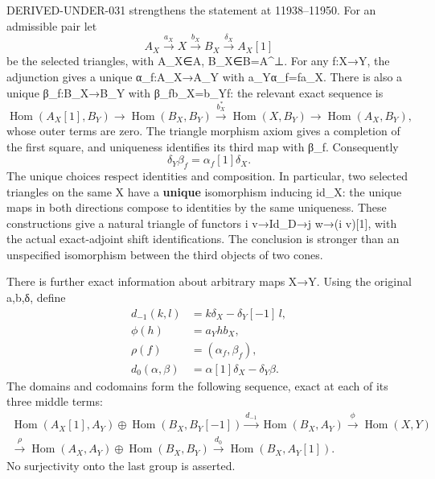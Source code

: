 DERIVED-UNDER-031 strengthens the statement at 11938–\allowbreak{}11950. For an admissible pair let \[
 A_X\xrightarrow{a_X}X\xrightarrow{b_X}B_X
 \xrightarrow{\delta_X}A_X[1]
\] be the selected triangles,\allowbreak{} with A\_\allowbreak{}X\allowbreak{}∈A,\allowbreak{} B\_\allowbreak{}X\allowbreak{}∈B\allowbreak{}=A\textasciicircum{}⊥. For any f:\allowbreak{}X\allowbreak{}→Y,\allowbreak{} the adjunction gives a unique α\_\allowbreak{}f:\allowbreak{}A\_\allowbreak{}X\allowbreak{}→A\_\allowbreak{}Y with a\_\allowbreak{}Yα\_\allowbreak{}f\allowbreak{}=fa\_\allowbreak{}X. There is also a unique β\_\allowbreak{}f:\allowbreak{}B\_\allowbreak{}X\allowbreak{}→B\_\allowbreak{}Y with β\_\allowbreak{}fb\_\allowbreak{}X\allowbreak{}=b\_\allowbreak{}Yf:\allowbreak{} the relevant exact sequence is \[
 \operatorname{Hom}(A_X[1],B_Y)\longrightarrow
 \operatorname{Hom}(B_X,B_Y)\xrightarrow{b_X^*}
 \operatorname{Hom}(X,B_Y)\longrightarrow\operatorname{Hom}(A_X,B_Y),
\] whose outer terms are zero. The triangle morphism axiom gives a completion of the first square,\allowbreak{} and uniqueness identifies its third map with β\_\allowbreak{}f. Consequently \[
 \delta_Y\beta_f=\alpha_f[1]\delta_X.
\] The unique choices respect identities and composition. In particular,\allowbreak{} two selected triangles on the same X have a \textbf{unique} isomorphism inducing id\_\allowbreak{}X:\allowbreak{} the unique maps in both directions compose to identities by the same uniqueness. These constructions give a natural triangle of functors i v\allowbreak{}→Id\_\allowbreak{}D\allowbreak{}→j w\allowbreak{}→(i v)\allowbreak{}[1]\allowbreak{},\allowbreak{} with the actual exact-adjoint shift identifications. The conclusion is stronger than an unspecified isomorphism between the third objects of two cones.

There is further exact information about arbitrary maps X\allowbreak{}→Y. Using the original a,\allowbreak{}b,\allowbreak{}δ,\allowbreak{} define \[
\begin{aligned}
 d_{-1}(k,l)&=k\delta_X-\delta_Y[-1]\,l,\\
 \phi(h)&=a_Yh b_X,\\
 \rho(f)&=(\alpha_f,\beta_f),\\
 d_0(\alpha,\beta)&=\alpha[1]\delta_X-\delta_Y\beta.
\end{aligned}
\] The domains and codomains form the following sequence,\allowbreak{} exact at each of its three middle terms:\allowbreak{} \[
\begin{gathered}
 \operatorname{Hom}(A_X[1],A_Y)\oplus
 \operatorname{Hom}(B_X,B_Y[-1])
 \xrightarrow{d_{-1}}\operatorname{Hom}(B_X,A_Y)
 \xrightarrow{\phi}\operatorname{Hom}(X,Y)\\
 \xrightarrow{\rho}
 \operatorname{Hom}(A_X,A_Y)\oplus\operatorname{Hom}(B_X,B_Y)
 \xrightarrow{d_0}\operatorname{Hom}(B_X,A_Y[1]).
 \tag{5.1}
\end{gathered}
\] No surjectivity onto the last group is asserted.

